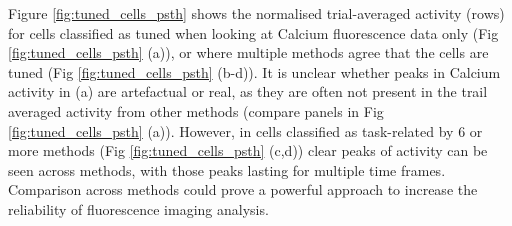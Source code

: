 \documentclass[a4paper,10pt,twocolumn]{article}
\begin{document}

Figure \ref{fig:tuned_cells_psth} shows the normalised trial-averaged activity (rows) for cells classified as tuned when looking at Calcium fluorescence data only (Fig \ref{fig:tuned_cells_psth} (a)), or where multiple methods agree that the cells are tuned (Fig \ref{fig:tuned_cells_psth} (b-d)). It is unclear whether peaks in Calcium activity in (a) are artefactual or real, as they are often not present in the trail averaged activity from other methods (compare panels in Fig \ref{fig:tuned_cells_psth} (a)). However, in cells classified as task-related by 6 or more methods (Fig \ref{fig:tuned_cells_psth} (c,d)) clear peaks of activity can be seen across methods, with those peaks lasting for multiple time frames. Comparison across methods could prove a powerful approach to increase the reliability of fluorescence imaging analysis.
\end{document}

